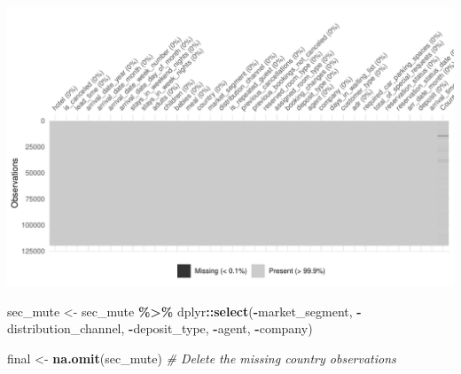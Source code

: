 \documentclass[11pt,a4paper,]{article}
\newenvironment{Shaded}{\begin{snugshade}}{\end{snugshade}}
\newcommand{\CommentTok}[1]{\textcolor[rgb]{0.56,0.35,0.01}{\textit{#1}}}
\newcommand{\KeywordTok}[1]{\textcolor[rgb]{0.13,0.29,0.53}{\textbf{#1}}}
\newcommand{\NormalTok}[1]{#1}
\newcommand{\OperatorTok}[1]{\textcolor[rgb]{0.81,0.36,0.00}{\textbf{#1}}}
\newcommand{\StringTok}[1]{\textcolor[rgb]{0.31,0.60,0.02}{#1}}
\begin{document}
\includegraphics{tidy_files/figure-latex/sectidy-1.pdf}

\begin{Shaded}
\begin{Highlighting}[]
\NormalTok{sec\_mute \textless{}{-}}\StringTok{ }\NormalTok{sec\_mute  }\OperatorTok{\%\textgreater{}\%}\StringTok{ }\NormalTok{dplyr}\OperatorTok{::}\KeywordTok{select}\NormalTok{(}\OperatorTok{{-}}\NormalTok{market\_segment,}
                               \OperatorTok{{-}}\NormalTok{distribution\_channel,}
                               \OperatorTok{{-}}\NormalTok{deposit\_type,}
                               \OperatorTok{{-}}\NormalTok{agent,}
                               \OperatorTok{{-}}\NormalTok{company) }
\end{Highlighting}
\end{Shaded}

\begin{Shaded}
\begin{Highlighting}[]
\NormalTok{final \textless{}{-}}\StringTok{ }\KeywordTok{na.omit}\NormalTok{(sec\_mute)  }\CommentTok{\# Delete the missing country observations}
\end{Highlighting}
\end{Shaded}


\printbibliography
\end{document}
